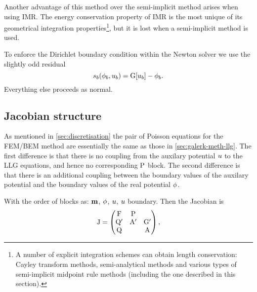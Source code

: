 Another advantage of this method over the semi-implicit method arises when using IMR.
The energy conservation property of IMR is the most unique of its geometrical integration properties\footnote{A number of explicit integration schemes can obtain length conservation: Cayley transform methods\cite{Lewis2003}, semi-analytical methods\cite{Wiele2010} and various types of semi-implicit midpoint rule methods\cite{Spargo2003}\cite{Mentink2010} (including the one described in this section).}, but it is lost when a semi-implicit method is used.

To enforce the Dirichlet boundary condition within the Newton solver we use the slightly odd residual
\newcommand{\rphimb}{\rphi_b}
\begin{equation}
  \rphimb(\phim_b, \phione_b) = \bm[\phione_b] - \phim_b.
\end{equation}
Everything else proceeds as normal.


\subsection{Jacobian structure}
\label{sec:bem-jacobian-structure}

As mentioned in \cref{sec:discretisation} the pair of Poisson equations for the FEM/BEM method are essentially the same as those in \cref{sec:galerk-meth-llg}.
The first difference is that there is no coupling from the auxilary potential $u$ to the LLG equations, and hence no corresponding $\mathrm{P}$ block.
The second difference is that there is an additional coupling between the boundary values of the auxilary potential and the boundary values of the real potential $\phi$.

With the order of blocks as: $\mathbf{m}$, $\phi$, $u$, $u$ boundary.
Then the Jacobian is
\begin{equation}
  \mathrm{J} = 
  \begin{pmatrix}
    \mathrm{F}       & \mathrm{P}     &  \\
    \mathrm{Q}'      & \mathrm{A}' &  {\mathbf{\mathrm{G}}}'  \\
    \mathrm{Q}       &         &   \mathrm{A}
  \end{pmatrix},
\end{equation}


